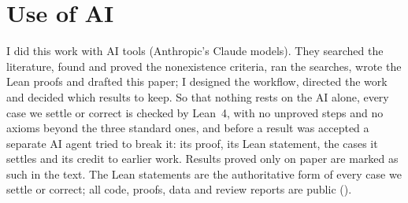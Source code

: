 \section*{Use of AI}

I did this work with AI tools (Anthropic's Claude models). They searched the literature,
found and proved the nonexistence criteria, ran the searches, wrote the Lean proofs and drafted
this paper; I designed the workflow, directed the work and decided which results to keep. So
that nothing rests on the AI alone, every case we settle or correct is checked by Lean~4, with
no unproved steps and no axioms beyond the three standard ones, and before a result was
accepted a separate AI agent tried to break it: its proof, its Lean statement, the cases it
settles and its credit to earlier work. Results proved only on paper are marked as such in the
text. The Lean statements are the authoritative form of every case we settle or correct; all
code, proofs, data and review reports are public (\repo).
